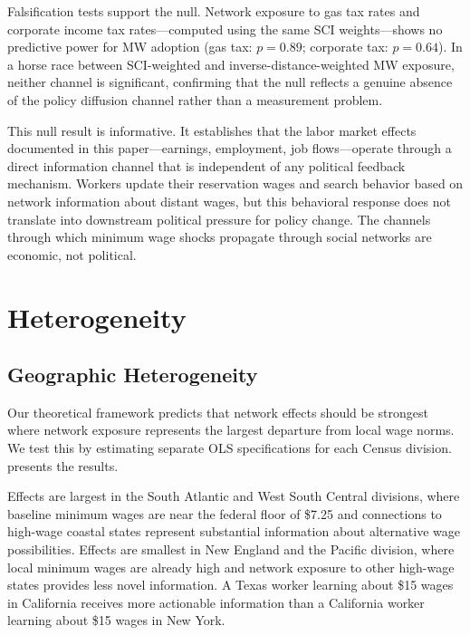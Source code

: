 \documentclass[12pt]{article}
\begin{document}
Falsification tests support the null. Network exposure to gas tax rates and corporate income tax rates---computed using the same SCI weights---shows no predictive power for MW adoption (gas tax: $p = 0.89$; corporate tax: $p = 0.64$). In a horse race between SCI-weighted and inverse-distance-weighted MW exposure, neither channel is significant, confirming that the null reflects a genuine absence of the policy diffusion channel rather than a measurement problem.

This null result is informative. It establishes that the labor market effects documented in this paper---earnings, employment, job flows---operate through a direct information channel that is independent of any political feedback mechanism. Workers update their reservation wages and search behavior based on network information about distant wages, but this behavioral response does not translate into downstream political pressure for policy change. The channels through which minimum wage shocks propagate through social networks are economic, not political.

\section{Heterogeneity}
\label{sec:heterogeneity}

\subsection{Geographic Heterogeneity}

Our theoretical framework predicts that network effects should be strongest where network exposure represents the largest departure from local wage norms. We test this by estimating separate OLS specifications for each Census division.  presents the results.

Effects are largest in the South Atlantic and West South Central divisions, where baseline minimum wages are near the federal floor of \$7.25 and connections to high-wage coastal states represent substantial information about alternative wage possibilities. Effects are smallest in New England and the Pacific division, where local minimum wages are already high and network exposure to other high-wage states provides less novel information. A Texas worker learning about \$15 wages in California receives more actionable information than a California worker learning about \$15 wages in New York.
\end{document}
